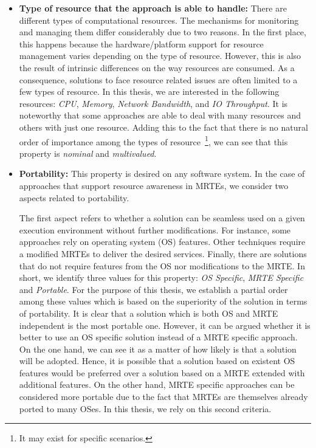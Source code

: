 \begin{itemize}
\item\textbf{Type of resource that the approach is able to handle:}
There are different types of computational resources.
The mechanisms for monitoring and managing them differ considerably due to two reasons.
In the first place, this happens because the hardware/platform support for resource management varies depending on the type of resource.
However, this is also the result of intrinsic differences on the way resources are consumed.
As a consequence, solutions to face resource related issues are often limited to a few types of resource.
In this thesis, we are interested in the following resources: \textit{CPU}, \textit{Memory}, \textit{Network Bandwidth}, and \textit{IO Throughput}.
It is noteworthy that some approaches are able to deal with many resources and others with just one resource.
Adding this to the fact that there is no natural order of importance among the types of resource~\footnote{It may exist for specific scenarios.}, we can see that this property is \textit{nominal} and \textit{multivalued}.  

\item \textbf{Portability:}
This property is desired on any software system.
In the case of approaches that support resource awareness in MRTEs, we consider two aspects related to portability.

The first aspect refers to whether a solution can be seamless used on a given execution environment without further modifications.
For instance, some approaches rely on operating system (OS) features.
Other techniques require a modified MRTEs to deliver the desired services.
Finally, there are solutions that do not require features from the OS nor modifications to the MRTE.
In short, we identify three values for this property: \textit{OS Specific}, \textit{MRTE Specific} and \textit{Portable}.
For the purpose of this thesis, we establish a partial order among these values which is based on the superiority of the solution in terms of portability.
It is clear that a solution which is both OS and MRTE independent is the most portable one.
However, it can be argued whether it is better to use an OS specific solution instead of a MRTE specific approach.        
On the one hand, we can see it as a matter of how likely is that a solution will be adopted. 
Hence, it is possible that a solution based on existent OS features would be preferred over a solution based on a MRTE extended with additional features.
On the other hand, MRTE specific approaches can be considered more portable due to the fact that MRTEs are themselves already ported to many OSes.
In this thesis, we rely on this second criteria.


\end{itemize}
